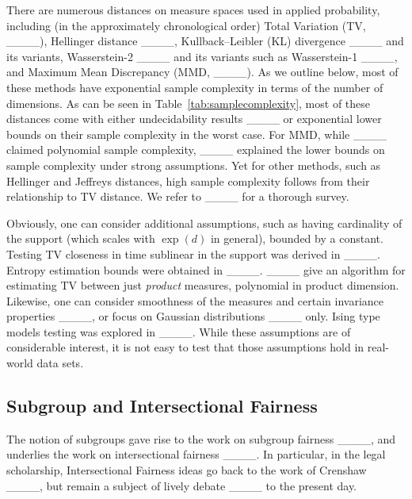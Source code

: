 There are numerous distances on measure spaces used in applied probability, including (in the approximately chronological order)
Total Variation (TV, ____),
Hellinger distance ____,
Kullback–Leibler (KL) divergence ____ and its variants,
Wasserstein-2 ____ and its variants such as Wasserstein-1 ____,  and
Maximum Mean Discrepancy (MMD, ____).
As we outline below,   most of these methods have exponential sample complexity in terms of the number of dimensions.
As can be seen in Table~\ref{tab:samplecomplexity}, most of these distances come with either undecidability results ____ or
exponential lower bounds on their sample complexity in the worst case.
For MMD, while ____ claimed polynomial sample complexity,  ____ explained the lower bounds on sample complexity under strong assumptions.
Yet for other methods, such as Hellinger and Jeffreys distances, %
high sample complexity follows from their relationship to TV distance.
We refer to ____ for a thorough survey.

Obviously, one can consider additional assumptions, such as having cardinality of the support (which scales with $\exp(d)$ in general), bounded by a constant. Testing TV closeness in time sublinear in the support was derived in
____.
Entropy estimation bounds were obtained in ____.
____ give an algorithm for estimating TV between just \emph{product} measures, polynomial in product dimension.
Likewise, one can consider smoothness of the measures and certain invariance properties ____, or focus on Gaussian distributions ____ only.
Ising type models testing was explored in ____. While these assumptions are of considerable interest,
it is not easy to test that those assumptions hold in real-world data sets.


\subsection{Subgroup and Intersectional Fairness}

The notion of subgroups gave rise to the
 work on subgroup fairness ____, and underlies the work on intersectional fairness ____.
In particular, in the legal scholarship, Intersectional Fairness ideas go back to the work of
Crenshaw ____, but remain a subject of lively debate ____ to the present day.

